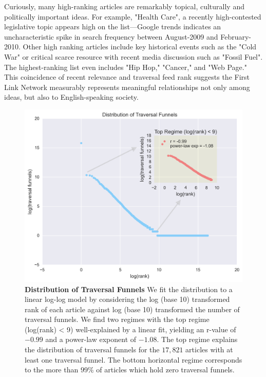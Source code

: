 \documentclass[pre,twocolumn,twoside,superscriptaddress,floatfix, aps, 10pt]{revtex4-1}
\begin{document}
Curiously, many high-ranking articles are remarkably topical, culturally and politically important ideas.  For example, "Health Care", a recently high-contested legislative topic appears high on the list---Google trends indicates an uncharacteristic spike in search frequency between August-2009 and February-2010.
Other high ranking articles include key historical events such as the "Cold War" or critical scarce resource with recent 
media discussion such as "Fossil Fuel". 
The highest-ranking list even includes "Hip Hop," "Cancer," and "Web Page."
This coincidence of recent relevance and traversal feed rank suggests the First Link Network measurably represents
meaningful relationships not only among ideas, but also to English-speaking society. 
\begin{figure}[tp!]
  \centering	
  \includegraphics[width=\columnwidth]{graphics/funnels_distribution.png}
  \caption{
    \textbf{Distribution of Traversal Funnels}
  We fit the distribution to a linear log-log model by considering the log (base 10) transformed rank of each article against log (base 10) transformed the number of traversal funnels. 
  We find two regimes with the top regime (log(rank) < 9) 
  well-explained by a linear fit, yielding an r-value of $-0.99$ and a 
  power-law exponent of $-1.08$. The top regime 
  explains the distribution of traversal funnels for the $17, 821$ 
  articles with at least one traversal funnel. The bottom 
  horizontal regime corresponds to the more than $99\%$ of articles
  which hold zero traversal funnels.
  }
  \label{fig:Funnels Distribution}
\end{figure}
\end{document}
